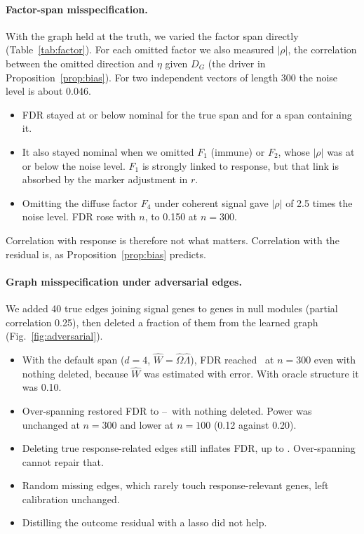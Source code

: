 \documentclass[10pt,twocolumn,letterpaper]{article}
\theoremstyle{remark}
\begin{document}
\paragraph{Factor-span misspecification.} With the graph held at the truth, we varied the factor span directly (Table~\ref{tab:factor}). For each omitted factor we also measured $|\rho|$, the correlation between the omitted direction and $\eta$ given $D_G$ (the driver in Proposition~\ref{prop:bias}). For two independent vectors of length 300 the noise level is about 0.046.
\begin{itemize}
  \item FDR stayed at or below nominal for the true span and for a span containing it.
  \item It also stayed nominal when we omitted $F_1$ (immune) or $F_2$, whose $|\rho|$ was at or below the noise level. $F_1$ is strongly linked to response, but that link is absorbed by the marker adjustment in $r$.
  \item Omitting the diffuse factor $F_4$ under coherent signal gave $|\rho|$ of 2.5 times the noise level. FDR rose with $n$, to 0.150 at $n=300$.
\end{itemize}
Correlation with response is therefore not what matters. Correlation with the residual is, as Proposition~\ref{prop:bias} predicts.

\begin{table}[t]
\centering\footnotesize
\caption{FDR ($r=1$, AUC 0.8) by factor span, with the oracle graph (300 replicates, Monte Carlo SE $\le$0.013). $|\rho|$: measured correlation between the omitted direction and $\eta$ given $D_G$, for sparse/coherent signal.}
\label{tab:factor}
\resizebox{\columnwidth}{!}{}
\end{table}

\paragraph{Graph misspecification under adversarial edges.} We added 40 true edges joining signal genes to genes in null modules (partial correlation 0.25), then deleted a fraction of them from the learned graph (Fig.~\ref{fig:adversarial}).
\begin{itemize}
  \item With the default span ($d=4$, $\hat W=\hat\Omega\hat\Lambda$), FDR reached \advOldNoDropHi\ at $n=300$ even with nothing deleted, because $\hat W$ was estimated with error. With oracle structure it was 0.10.
  \item Over-spanning restored FDR to \advNewNoDropLo--\advNewNoDropHi\ with nothing deleted. Power was unchanged at $n=300$ and lower at $n=100$ (0.12 against 0.20).
  \item Deleting true response-related edges still inflates FDR, up to \advNewDropHi. Over-spanning cannot repair that.
  \item Random missing edges, which rarely touch response-relevant genes, left calibration unchanged.
  \item Distilling the outcome residual with a lasso \citep{liu2022dcrt} did not help.
\end{itemize}
\end{document}
